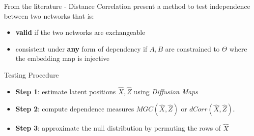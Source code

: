 \documentclass[10.5pt]{beamer}
\begin{document}
\begin{frame}{From the literature - Distance Correlation}
\citet{lee_network_2019} present a method to test independence between two networks that is:
\begin{itemize}
    \item \textbf{valid} if the two networks are exchangeable 
    \item consistent under \textbf{any} form of dependency if $A, B$ are constrained to $\Theta$ where the embedding map is injective
\end{itemize}

\begin{block}{Testing Procedure }
\begin{itemize}
    \item \textbf{Step 1}: estimate latent positions $\hat{X}, \hat{Z}$ using \textit{Diffusion Maps} \citep{coifman_geometric_2005}
    \item \textbf{Step 2}: compute dependence measures $MGC(\hat{X}, \hat{Z})$ or $dCorr(\hat{X}, \hat{Z})$.
    \item \textbf{Step 3}: approximate the null distribution by permuting the rows of $\hat{X}$
\end{itemize}
\end{block}

\end{frame}



\end{document}
